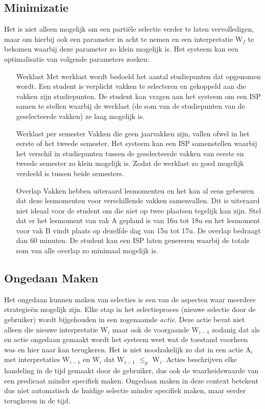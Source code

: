 \subsection{Minimizatie}
Het is niet alleen mogelijk om een parti\"{e}le selectie verder te laten vervolledigen, maar om hierbij ook een parameter in acht te nemen en een interpretatie W$_{f}$ te bekomen waarbij deze parameter zo klein mogelijk is. Het systeem kan een optimalisatie van volgende parameters zoeken:
\begin{itemize}
\item[Werklast] Met werklast wordt bedoeld het aantal studiepunten dat opgenomen wordt. Een student is verplicht vakken te selecteren en gekoppeld aan die vakken zijn studiepunten. De student kan vragen aan het systeem om een ISP samen te stellen waarbij de werklast (de som van de studiepunten van de geselecteerde vakken) ze laag mogelijk is.
\item[Werklast per semester] Vakken die geen jaarvakken zijn, vallen ofwel in het eerste of het tweede semester. Het systeem kan een ISP samenstellen waarbij het verschil in studiepunten tussen de geselecteerde vakken van eerste en tweede semester zo klein mogelijk is. Zodat de werklast zo goed mogelijk verdeeld is tussen beide semesters.
\item[Overlap] Vakken hebben uiteraard lesmomenten en het kan al eens gebeuren dat deze lesmomenten voor verschillende vakken samenvallen. Dit is uiteraard niet ideaal voor de student om die niet op twee plaatsen tegelijk kan zijn. Stel dat er het lesmoment van vak A gepland is van 16u tot 18u en het lesmoment voor vak B vindt plaats op dezelfde dag van 15u tot 17u. De overlap bedraagt dan 60 minuten. De student kan een ISP laten genereren waarbij de totale som van alle overlap zo minimaal mogelijk is. 
\end{itemize}

\subsection{Ongedaan Maken}
Het ongedaan kunnen maken van selecties is een van de aspecten waar meerdere strategie\"{e}n mogelijk zijn. Elke stap in het selectieproces (nieuwe selectie door de gebruiker) wordt bijgehouden in een zogenaamde \textit{actie}. Deze actie bevat niet alleen die nieuwe interpretatie W$_{i}$ maar ook de voorgaande W$_{i-1}$ zodanig dat als en actie ongedaan gemaakt wordt het systeem weet wat de toestand voorheen was en hier naar kan terugkeren. Het is niet noodzakelijk zo dat in een actie A$_{i}$ met interpretaties W$_{i-1}$ en W$_{i}$ dat W$_{i-1}$ $\leq_{p}$ W$_{i}$. Acties beschrijven elke handeling in de tijd gemaakt door de gebruiker, dus ook de waarheidswaarde van een predicaat minder specifiek maken. Ongedaan maken in deze context betekent dus niet automatisch de huidige selectie minder specifiek maken, maar eerder terugkeren in de tijd.

